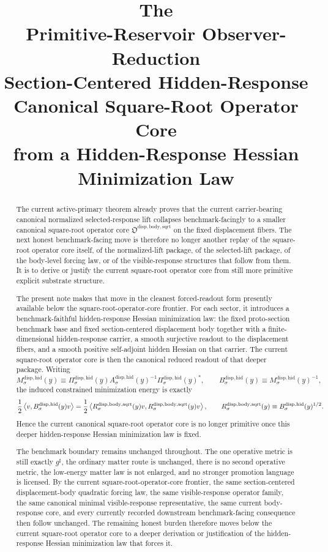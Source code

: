 \documentclass[11pt]{article}
\title{\textbf{The \TheoryName{}}\\[0.4em]
\large Primitive-Reservoir Observer-Reduction\\
\large Section-Centered Hidden-Response\\
\large Canonical Square-Root Operator Core\\
\large from a Hidden-Response Hessian\\
\large Minimization Law}
\author{}
\date{}
\newcommand{\CompletedMetric}{g^{\sharp}}
\newcommand{\SquareRootOperatorCore}{\mathfrak O^{\mathrm{disp,body,sqrt}}}
\newcommand{\SquareRootOperator}[1]{R_{#1}^{\mathrm{disp,body,sqrt}}}
\newcommand{\HiddenReadout}[1]{\Pi_{#1}^{\mathrm{disp,hid}}}
\newcommand{\HiddenHessian}[1]{A_{#1}^{\mathrm{disp,hid}}}
\newcommand{\ReducedSchur}[1]{M_{#1}^{\mathrm{disp,hid}}}
\newcommand{\ReducedCoreOperator}[1]{B_{#1}^{\mathrm{disp,hid}}}
\begin{document}
\maketitle

\begin{abstract}
The current active-primary theorem already proves that the current carrier-bearing canonical normalized selected-response lift collapses benchmark-facingly to a smaller canonical square-root operator core \(\SquareRootOperatorCore\) on the fixed displacement fibers. The next honest benchmark-facing move is therefore no longer another replay of the square-root operator core itself, of the normalized-lift package, of the selected-lift package, of the body-level forcing law, or of the visible-response structures that follow from them. It is to derive or justify the current square-root operator core from still more primitive explicit substrate structure.

The present note makes that move in the cleanest forced-readout form presently available below the square-root-operator-core frontier. For each sector, it introduces a benchmark-faithful hidden-response Hessian minimization law: the fixed proto-section benchmark base and fixed section-centered displacement body together with a finite-dimensional hidden-response carrier, a smooth surjective readout to the displacement fibers, and a smooth positive self-adjoint hidden Hessian on that carrier. The current square-root operator core is then the canonical reduced readout of that deeper package. Writing
\[
\ReducedSchur{\sigma}(y)
\equiv
\HiddenReadout{\sigma}(y)\HiddenHessian{\sigma}(y)^{-1}\HiddenReadout{\sigma}(y)^*,
\qquad
\ReducedCoreOperator{\sigma}(y)
\equiv
\ReducedSchur{\sigma}(y)^{-1},
\]
the induced constrained minimization energy is exactly
\[
\frac{1}{2}
\ev{v,\ReducedCoreOperator{\sigma}(y)v}
=
\frac{1}{2}
\ev{
\SquareRootOperator{\sigma}(y)v,
\SquareRootOperator{\sigma}(y)v
},
\qquad
\SquareRootOperator{\sigma}(y)
\equiv
\ReducedCoreOperator{\sigma}(y)^{1/2}.
\]
Hence the current canonical square-root operator core is no longer primitive once this deeper hidden-response Hessian minimization law is fixed.

The benchmark boundary remains unchanged throughout. The one operative metric is still exactly \(\CompletedMetric\), the ordinary matter route is unchanged, there is no second operative metric, the low-energy matter law is not enlarged, and no stronger promotion language is licensed. By the current square-root-operator-core frontier, the same section-centered displacement-body quadratic forcing law, the same visible-response operator family, the same canonical minimal visible-response representative, the same current body-response core, and every currently recorded downstream benchmark-facing consequence then follow unchanged. The remaining honest burden therefore moves below the current square-root operator core to a deeper derivation or justification of the hidden-response Hessian minimization law that forces it.
\end{abstract}
\end{document}
